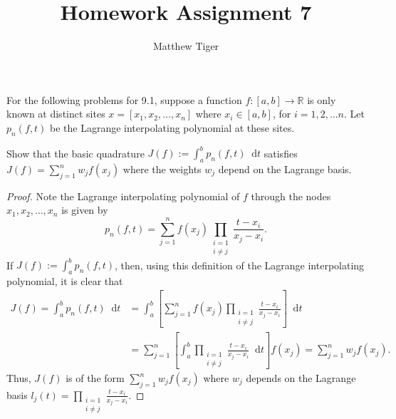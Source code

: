 \documentclass[12pt]{article}
\title{Homework Assignment 7}
\author{Matthew Tiger}
\theoremstyle{definition}
\newenvironment{custompbm}[1]
  {\renewcommand\theproblem{#1}\problem}
  {\endproblem}
\newcommand*\diff{\mathop{}\!\mathrm{d}}
\begin{document}
\maketitle


\begin{custompbm}{9.1}
  For the following problems for 9.1, suppose a function $f: [a, b] \to \mathbb{R}$ is only known at distinct sites
  $x = [x_1, x_2, \dots, x_n]$ where $x_i \in [a,b]$, for $i=1, 2, \dots n$. Let $p_n(f, t)$
  be the Lagrange interpolating polynomial at these sites.
\end{custompbm}

\begin{custompbm}{9.1.1}
  Show that the basic quadrature $J(f) := \int_a^b p_n(f, t) \diff{t}$ satisfies
  $J(f) = \sum_{j=1}^n w_j f(x_j)$ where the weights $w_j$ depend on the Lagrange basis.
\end{custompbm}

\begin{proof}
  Note the Lagrange interpolating polynomial of $f$ through the nodes
  $x_1, x_2, \dots, x_n$ is given by
  \[
    p_n(f, t) = \sum_{j=1}^{n} f(x_j) \prod_{\substack{i=1\\i\neq j}} \frac{t - x_i}{x_j - x_i}.
  \]
  If $J(f) := \int_a^b p_n(f, t)$, then, using this definition of the Lagrange interpolating
  polynomial, it is clear that
  \begin{align*}
    J(f) = \int_a^b p_n(f, t) \diff{t}
    &= \int_a^b \left[\sum_{j=1}^{n} f(x_j) \prod_{\substack{i=1\\i\neq j}} \frac{t - x_i}{x_j - x_i}\right] \diff{t}\\
    &= \sum_{j=1}^{n} \left[\int_a^b \prod_{\substack{i=1\\i\neq j}} \frac{t - x_i}{x_j - x_i} \diff{t} \right] f(x_j) = \sum_{j=1}^{n} w_j f(x_j).
  \end{align*}
  Thus, $J(f)$ is of the form $\sum_{j=1}^{n} w_j f(x_j)$ where $w_j$ depends on
  the Lagrange basis $l_j(t) = \prod_{\substack{i=1\\i\neq j}} \frac{t - x_i}{x_j - x_i}$.
\end{proof}
\end{document}
